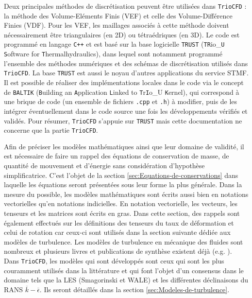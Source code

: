 Deux principales m\'ethodes de discr\'etisation peuvent \^etre utilis\'ees
dans \texttt{TrioCFD} : la m\'ethode des Volume-El\'ements Finis (VEF)
et celle des Volume-Diff\'erence Finies (VDF). Pour les VEF, les maillages
associ\'es \`a cette m\'ethode doivent n\'ecessairement \^etre triangulaires
(en 2D) ou t\'etra\'edriques (en 3D). Le code est programm\'e en langage
\texttt{C++} et est bas\'e sur la base logicielle \texttt{TRUST} (\texttt{TR}io\_\texttt{U}
\texttt{S}oftware for \texttt{T}hermalhydraulics), dans lequel sont
notamment programm\'e l\textquoteright ensemble des m\'ethodes num\'eriques
et des sch\'emas de discr\'etisation utilis\'es dans \texttt{TrioCFD}. La
base \texttt{TRUST} est aussi le noyau d'autres applications du service
STMF. Il est possible de r\'ealiser des impl\'ementations locales dans
le code via le concept de \texttt{BALTIK} (\texttt{B}uilding an \texttt{A}pplication
\texttt{L}inked to \texttt{T}r\texttt{I}o\_U \texttt{K}ernel), qui
correspond \`a une brique de code (un ensemble de fichiers \texttt{.cpp}
et \texttt{.h}) \`a modifier, puis de les int\'egrer \'eventuellement dans
le code source une fois les d\'eveloppements v\'erifi\'es et valid\'es. Pour
r\'esumer, \texttt{TrioCFD} s'appuie sur \texttt{TRUST} mais cette documentation
ne concerne que la partie \texttt{TrioCFD}.

Afin de pr\'eciser les mod\`eles math\'ematiques ainsi que leur domaine
de validit\'e, il est n\'ecessaire de faire un rappel des \'equations de
conservation de masse, de quantit\'e de mouvement et d'\'energie sans
consid\'eration d'hypoth\`ese simplificatrice. C'est l'objet de la section
\ref{sec:Equations-de-conservations} dans laquelle les \'equations
seront pr\'esent\'ees sous leur forme la plus g\'en\'erale. Dans la mesure
du possible, les mod\`eles math\'ematiques sont \'ecrits aussi bien en notations
vectorielles qu'en notations indicielles. En notation vectorielle,
les vecteurs, les tenseurs et les matrices sont \'ecrits en gras. Dans
cette section, des rappels sont \'egalement effectu\'es sur les d\'efinitions
des tenseurs du taux de d\'eformation et celui de rotation car ceux-ci
sont utilis\'es dans la section suivante d\'edi\'ee aux mod\`eles de turbulence.
Les mod\`eles de turbulence en m\'ecanique des fluides sont nombreux et
plusieurs livres et publications de synth\`ese existent d\'ej\`a
(e.g. \cite{Book_Chassaing,Argyropoulos-Markatos_ReviewTurbulence_AMM2015}).
Dans \texttt{TrioCFD}, les mod\`eles qui sont d\'evelopp\'es sont ceux qui
sont les plus couramment utilis\'es dans la litt\'erature et qui font
l'objet d'un consensus dans le domaine tels que la LES (Smagorinski
et WALE) et les diff\'erentes d\'eclinaisons du RANS $\overline{k}-\overline{\epsilon}$.
Ils seront d\'etaill\'es dans la section \ref{sec:Modeles-de-turbulence}.\\

